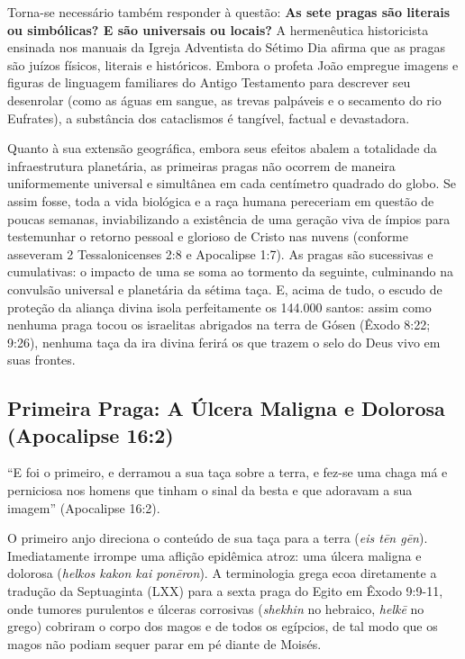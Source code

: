 \documentclass[11pt,a4paper,openany]{book}
\begin{document}
Torna-se necessário também responder à questão: \textbf{As sete pragas são literais ou simbólicas? E são universais ou locais?}
A hermenêutica historicista ensinada nos manuais da Igreja Adventista do Sétimo Dia afirma que as pragas são juízos físicos, literais e históricos. Embora o profeta João empregue imagens e figuras de linguagem familiares do Antigo Testamento para descrever seu desenrolar (como as águas em sangue, as trevas palpáveis e o secamento do rio Eufrates), a substância dos cataclismos é tangível, factual e devastadora.

Quanto à sua extensão geográfica, embora seus efeitos abalem a totalidade da infraestrutura planetária, as primeiras pragas não ocorrem de maneira uniformemente universal e simultânea em cada centímetro quadrado do globo. Se assim fosse, toda a vida biológica e a raça humana pereceriam em questão de poucas semanas, inviabilizando a existência de uma geração viva de ímpios para testemunhar o retorno pessoal e glorioso de Cristo nas nuvens (conforme asseveram 2 Tessalonicenses 2:8 e Apocalipse 1:7). As pragas são sucessivas e cumulativas: o impacto de uma se soma ao tormento da seguinte, culminando na convulsão universal e planetária da sétima taça. E, acima de tudo, o escudo de proteção da aliança divina isola perfeitamente os 144.000 santos: assim como nenhuma praga tocou os israelitas abrigados na terra de Gósen (Êxodo 8:22; 9:26), nenhuma taça da ira divina ferirá os que trazem o selo do Deus vivo em suas frontes.



\subsection{Primeira Praga: A Úlcera Maligna e Dolorosa (Apocalipse 16:2)}


``E foi o primeiro, e derramou a sua taça sobre a terra, e fez-se uma chaga má e perniciosa nos homens que tinham o sinal da besta e que adoravam a sua imagem'' (Apocalipse 16:2).

O primeiro anjo direciona o conteúdo de sua taça para a terra (\textit{eis tēn gēn}). Imediatamente irrompe uma aflição epidêmica atroz: uma úlcera maligna e dolorosa (\textit{helkos kakon kai ponēron}). A terminologia grega ecoa diretamente a tradução da Septuaginta (LXX) para a sexta praga do Egito em Êxodo 9:9-11, onde tumores purulentos e úlceras corrosivas (\textit{shekhin} no hebraico, \textit{helkē} no grego) cobriram o corpo dos magos e de todos os egípcios, de tal modo que os magos não podiam sequer parar em pé diante de Moisés.
\end{document}
